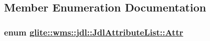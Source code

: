 \subsection{Member Enumeration Documentation}
\hypertarget{classglite_1_1wms_1_1jdl_1_1JdlAttributeList_z25_0}{
\subsubsection[Attr]{\setlength{\rightskip}{0pt plus 5cm}enum \hyperlink{classglite_1_1wms_1_1jdl_1_1JdlAttributeList_z25_0}{glite::wms::jdl::Jdl\-Attribute\-List::Attr}}}
\label{classglite_1_1wms_1_1jdl_1_1JdlAttributeList_z25_0}


